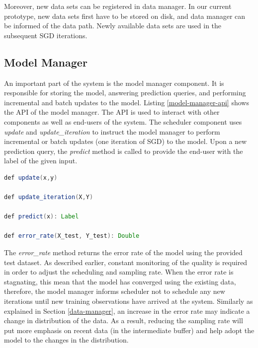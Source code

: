 \documentclass{vldb}
\begin{document}
Moreover,  new data sets can be registered in data manager.
In our current prototype, new data sets first have to be stored on disk, and data manager can be informed of the data path.
Newly available data sets are used in the subsequent SGD iterations.

\subsection{Model Manager} \label{model-manager} 
An important part of the system is the model manager component.
It is responsible for storing the model, answering prediction queries, and performing incremental and batch updates to the model.
Listing \ref{model-manager-api} shows the API of the model manager.
The API is used to interact with other components as well as end-users of the system.
The scheduler component uses \textit{update} and \textit{update\_iteration} to instruct the model manager to perform incremental or batch updates (one iteration of SGD) to the model.
Upon a new prediction query, the \textit{predict} method is called to provide the end-user with the label of the given input.

\noindent\begin{minipage}[t]{\linewidth}
\begin{lstlisting}[language=java, basicstyle=\small\ttfamily, frame=tb ,columns=fullflexible,
showstringspaces=false,label=model-manager-api,caption=Model Manager API, numberstyle=\tiny]
def update(x,y)

def update_iteration(X,Y)

def predict(x): Label

def error_rate(X_test, Y_test): Double

\end{lstlisting}
\end{minipage}


The \textit{error\_rate} method returns the error rate of the model using the provided test dataset.
As described earlier, constant monitoring of the quality is required in order to adjust the scheduling and sampling rate.
When the error rate is stagnating, this mean that the model has converged using the existing data, therefore, the model manager informs scheduler not to schedule any new iterations until new training observations have arrived at the system.
Similarly as explained in Section \ref{data-manager}, an increase in the error rate may indicate a change in distribution of the data.
As a result, reducing the sampling rate will put more emphasis on recent data (in the intermediate buffer) and help adopt the model to the changes in the distribution.
\end{document}
